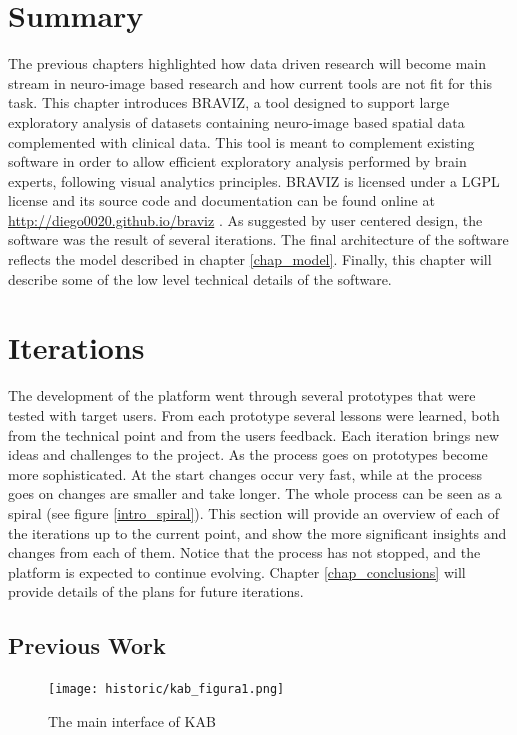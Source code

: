 \section{Summary}

The previous chapters highlighted how data driven research will become main stream in neuro-image based research and how current tools are not fit for this task. This chapter introduces BRAVIZ, a tool designed to support large exploratory analysis of datasets containing neuro-image based spatial data complemented with clinical data. This tool is meant to complement existing software in order to allow efficient exploratory analysis performed by brain experts, following visual analytics principles.
BRAVIZ is licensed under a LGPL license and its source code and documentation can be found online at \url{http://diego0020.github.io/braviz} . As suggested by user centered design, the software was the result of several iterations. The final architecture of the software reflects the model described in chapter \ref{chap_model}. Finally, this chapter will describe some of the low level technical details of the software.

\section{Iterations}
\label{sec_iterations}



The development of the platform went through several prototypes that were tested with target users. From each prototype several lessons were learned, both from the technical point and from the users feedback. Each iteration brings new ideas and challenges to the project. As the process goes on prototypes become more sophisticated. At the start changes occur very fast, while at the process goes on changes are smaller and take longer. The whole process can be seen as a spiral (see figure \ref{intro_spiral}). This section will provide an overview of each of the iterations up to the current point, and show the more significant insights and changes from each of them. Notice that the process has not stopped, and the platform is expected to continue evolving. Chapter \ref{chap_conclusions} will provide details of the plans for future iterations.

\subsection{Previous Work}
\label{sec_kab}
\begin{figure}
\centering
\texttt{[image: historic/kab\_figura1.png]}
\caption{\label{fig_kab}The main interface of KAB}
\end{figure}

